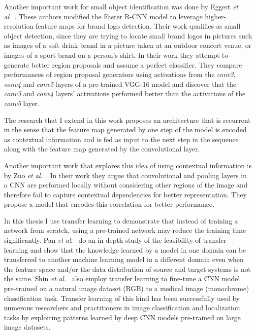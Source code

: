 \documentclass [11pt,letterpaper ,openany ]{report}
\begin{document}
    Another important work for small object identification was done by Eggert \textit{et al}.\ \cite{eggert2017improving}. These authors modified the Faster R-CNN model \cite{ren2015faster} to leverage higher-resolution feature maps for brand logo detection. Their work qualifies as small object detection, since they are trying to locate small brand logos in pictures such as images of a soft drink brand in a picture taken at an outdoor concert venue, or images of a sport brand on a person's shirt. In their work they attempt to generate better region proposals and assume a perfect classifier. They compare performances of region proposal generators using activations from the \textit{conv3}, \textit{conv4} and \textit{conv5} layers of a pre-trained VGG-16 model and discover that the \textit{conv3} and \textit{conv4} layers' activations performed better than the activations of the \textit{conv5} layer. 

    The research that I extend \cite{Singh_2016_CVPR} in this work proposes an architecture that is recurrent in the sense that the feature map generated by one step of the model is encoded as contextual information and is fed as input to the next step in the sequence along with the feature map generated by the convolutional layer. 

    Another important work that explores this idea of using contextual information is by Zuo \textit{et al}.\ \cite{zuo2015convolutional}. In their work they argue that convolutional and pooling layers in a CNN are performed locally without considering other regions of the image and therefore fail to capture contextual dependencies for better representation. They propose a model that encodes this correlation for better performance.

    In this thesis I use transfer learning to demonstrate that instead of training a network from scratch, using a pre-trained network may reduce  the training time significantly. Pan \textit{et al}.\ \cite{pan2010survey} do an in depth study of the feasibility of transfer learning and show that the knowledge learned by a model in one domain can be transferred to another machine learning model in a different domain even when the feature space and/or the data distribution of source and target systems is not the same. Shin \textit{et al}.\ \cite{hoo2016deep} also employ transfer learning to fine-tune a CNN model pre-trained on a natural image dataset (RGB) to a medical image (monochrome) classification task. Transfer learning of this kind has been successfully used by numerous researchers and practitioners in image classification and localization tasks by exploiting patterns learned by deep CNN models pre-trained on large image datasets. 
\end{document}
